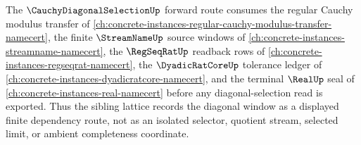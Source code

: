 The $\CauchyDiagonalSelectionUp$ forward route consumes the regular Cauchy modulus transfer of \autoref{ch:concrete-instances-regular-cauchy-modulus-transfer-namecert}, the finite $\StreamNameUp$ source windows of \autoref{ch:concrete-instances-streamname-namecert}, the $\RegSeqRatUp$ readback rows of \autoref{ch:concrete-instances-regseqrat-namecert}, the $\DyadicRatCoreUp$ tolerance ledger of \autoref{ch:concrete-instances-dyadicratcore-namecert}, and the terminal $\RealUp$ seal of \autoref{ch:concrete-instances-real-namecert} before any diagonal-selection read is exported. Thus the sibling lattice records the diagonal window as a displayed finite dependency route, not as an isolated selector, quotient stream, selected limit, or ambient completeness coordinate.
